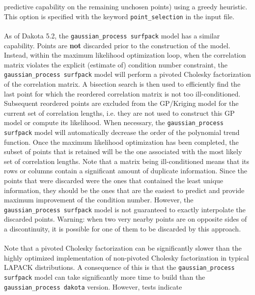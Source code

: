\begin{itemize}
      predictive capability on the remaining unchosen points) using a 
      greedy heuristic. This option is specified with the keyword 
      \texttt{point\_selection} in the input file.\\ \\
      As of Dakota 5.2, the \texttt{gaussian\_process surfpack} model has 
      a similar capability. Points are {\bf not} discarded prior to the 
      construction of the model.  Instead, within the maximum likelihood 
      optimization loop, when the correlation matrix  violates the 
      explicit (estimate of) condition number constraint, the 
      \texttt{gaussian\_process surfpack} model will perform a pivoted 
      Cholesky factorization of the correlation matrix.  A bisection search 
      is then used to efficiently find the last point for which the 
      reordered correlation matrix is not too ill-conditioned. Subsequent 
      reordered points are excluded from the GP/Kriging model for the 
      current set of correlation lengths, i.e. they are not used to 
      construct this GP model or compute its likelihood. When necessary, 
      the \texttt{gaussian\_process surfpack} model will automatically 
      decrease the order of the polynomial trend function.  Once the 
      maximum likelihood optimization has been completed, the subset of 
      points that is retained will be the one associated with the most 
      likely set of correlation lengths.  Note that a matrix being 
      ill-conditioned means that its rows or columns contain a significant 
      amount of duplicate information.  Since the points that were 
      discarded were the ones that contained the least unique information, 
      they should be the ones that are the easiest to predict and provide 
      maximum improvement of the condition number.  However, the 
      \texttt{gaussian\_process surfpack} model is not guaranteed to 
      exactly interpolate the discarded points.  Warning: when two very 
      nearby points are on opposite sides of a discontinuity, it is 
      possible for one of them to be discarded by this approach.\\ \\
      Note that a pivoted Cholesky factorization can be significantly
      slower than the highly optimized implementation of non-pivoted 
      Cholesky factorization in typical LAPACK distributions.  A 
      consequence of this is that the \texttt{gaussian\_process surfpack}
      model can take significantly more time to build than the 
      \texttt{gaussian\_process dakota} version.  However, tests indicate

\end{itemize}
